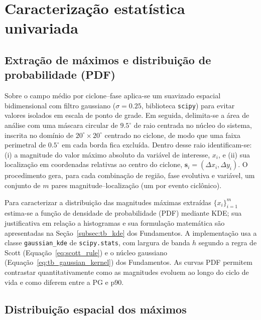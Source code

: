 
\section{Caracterização estatística univariada}\label{sec:tecnicas_estadisticas}

\subsection{Extração de máximos e distribuição de probabilidade (PDF)}\label{subsec:extraccion_pdf}

Sobre o campo médio por ciclone--fase aplica-se um suavizado espacial bidimensional com filtro gaussiano ($\sigma = 0.25$, biblioteca \texttt{scipy}) para evitar valores isolados em escala de ponto de grade. Em seguida, delimita-se a área de análise com uma máscara circular de $9.5^{\circ}$ de raio centrada no núcleo do sistema, inscrita no domínio de $20^{\circ} \times 20^{\circ}$ centrado no ciclone, de modo que uma faixa perimetral de $0.5^{\circ}$ em cada borda fica excluída. Dentro desse raio identificam-se: (i) a magnitude do valor máximo absoluto da variável de interesse, $x_i$, e (ii) sua localização em coordenadas relativas ao centro do ciclone, $\mathbf{s}_i = (\Delta x_i, \Delta y_i)$. O procedimento gera, para cada combinação de região, fase evolutiva e variável, um conjunto de $m$ pares magnitude--localização (um por evento ciclônico).

Para caracterizar a distribuição das magnitudes máximas extraídas $\{x_i\}_{i=1}^{m}$ estima-se a função de densidade de probabilidade (PDF) mediante KDE; sua justificativa em relação a histogramas e sua formulação matemática são apresentadas na Seção~\ref{subsec:tb_kde} dos Fundamentos. A implementação usa a classe \texttt{gaussian\_kde} de \texttt{scipy.stats}, com largura de banda $h$ segundo a regra de Scott (Equação~\ref{eq:scott_rule}) e o núcleo gaussiano (Equação~\ref{eq:tb_gaussian_kernel}) dos Fundamentos. As curvas PDF permitem contrastar quantitativamente como as magnitudes evoluem ao longo do ciclo de vida e como diferem entre a PG e p90.

\subsection{Distribuição espacial dos máximos}\label{subsec:kde_localizacion}

